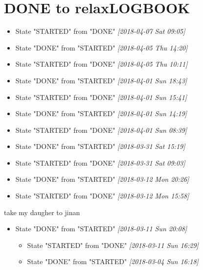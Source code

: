 \documentclass[cyan]{elegantnote}
\begin{document}
\chapter{{\bfseries\sffamily DONE} to relax\hfill{}\textsc{LOGBOOK}}
\label{sec:org0a2248a}
\begin{itemize}
\item State "STARTED"    from "DONE"       \textit{[2018-04-07 Sat 09:05]}
\end{itemize}
\begin{itemize}
\item State "DONE"       from "STARTED"    \textit{[2018-04-05 Thu 14:20]}
\item State "STARTED"    from "DONE"       \textit{[2018-04-05 Thu 10:11]}
\end{itemize}
\begin{itemize}
\item State "DONE"       from "STARTED"    \textit{[2018-04-01 Sun 18:43]}
\item State "STARTED"    from "DONE"       \textit{[2018-04-01 Sun 15:41]}
\end{itemize}
\begin{itemize}
\item State "DONE"       from "STARTED"    \textit{[2018-04-01 Sun 14:19]}
\item State "STARTED"    from "DONE"       \textit{[2018-04-01 Sun 08:39]}
\end{itemize}
\begin{itemize}
\item State "DONE"       from "STARTED"    \textit{[2018-03-31 Sat 15:19]}
\item State "STARTED"    from "DONE"       \textit{[2018-03-31 Sat 09:03]}
\end{itemize}
\begin{itemize}
\item State "DONE"       from "STARTED"    \textit{[2018-03-12 Mon 20:26]}
\item State "STARTED"    from "DONE"       \textit{[2018-03-12 Mon 15:58]}
\end{itemize}

take my daugher to jinan
\begin{itemize}
\item State "DONE"       from "STARTED"    \textit{[2018-03-11 Sun 20:08]}
\begin{itemize}
\item State "STARTED"    from "DONE"       \textit{[2018-03-11 Sun 16:29]}
\end{itemize}
\begin{itemize}
\item State "DONE"       from "STARTED"    \textit{[2018-03-04 Sun 16:18]}
\end{itemize}
\end{itemize}
\end{document}
